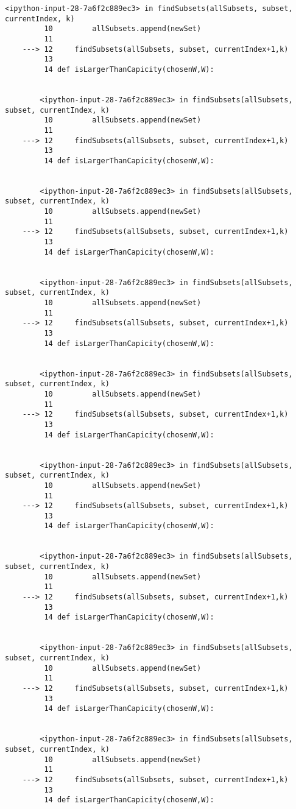 \documentclass[11pt]{article}
\begin{document}
\begin{Verbatim}[commandchars=\\\{\}]
        <ipython-input-28-7a6f2c889ec3> in findSubsets(allSubsets, subset, currentIndex, k)
         10         allSubsets.append(newSet)
         11 
    ---> 12     findSubsets(allSubsets, subset, currentIndex+1,k)
         13 
         14 def isLargerThanCapicity(chosenW,W):


        <ipython-input-28-7a6f2c889ec3> in findSubsets(allSubsets, subset, currentIndex, k)
         10         allSubsets.append(newSet)
         11 
    ---> 12     findSubsets(allSubsets, subset, currentIndex+1,k)
         13 
         14 def isLargerThanCapicity(chosenW,W):


        <ipython-input-28-7a6f2c889ec3> in findSubsets(allSubsets, subset, currentIndex, k)
         10         allSubsets.append(newSet)
         11 
    ---> 12     findSubsets(allSubsets, subset, currentIndex+1,k)
         13 
         14 def isLargerThanCapicity(chosenW,W):


        <ipython-input-28-7a6f2c889ec3> in findSubsets(allSubsets, subset, currentIndex, k)
         10         allSubsets.append(newSet)
         11 
    ---> 12     findSubsets(allSubsets, subset, currentIndex+1,k)
         13 
         14 def isLargerThanCapicity(chosenW,W):


        <ipython-input-28-7a6f2c889ec3> in findSubsets(allSubsets, subset, currentIndex, k)
         10         allSubsets.append(newSet)
         11 
    ---> 12     findSubsets(allSubsets, subset, currentIndex+1,k)
         13 
         14 def isLargerThanCapicity(chosenW,W):


        <ipython-input-28-7a6f2c889ec3> in findSubsets(allSubsets, subset, currentIndex, k)
         10         allSubsets.append(newSet)
         11 
    ---> 12     findSubsets(allSubsets, subset, currentIndex+1,k)
         13 
         14 def isLargerThanCapicity(chosenW,W):


        <ipython-input-28-7a6f2c889ec3> in findSubsets(allSubsets, subset, currentIndex, k)
         10         allSubsets.append(newSet)
         11 
    ---> 12     findSubsets(allSubsets, subset, currentIndex+1,k)
         13 
         14 def isLargerThanCapicity(chosenW,W):


        <ipython-input-28-7a6f2c889ec3> in findSubsets(allSubsets, subset, currentIndex, k)
         10         allSubsets.append(newSet)
         11 
    ---> 12     findSubsets(allSubsets, subset, currentIndex+1,k)
         13 
         14 def isLargerThanCapicity(chosenW,W):


        <ipython-input-28-7a6f2c889ec3> in findSubsets(allSubsets, subset, currentIndex, k)
         10         allSubsets.append(newSet)
         11 
    ---> 12     findSubsets(allSubsets, subset, currentIndex+1,k)
         13 
         14 def isLargerThanCapicity(chosenW,W):



\end{Verbatim}
\end{document}
